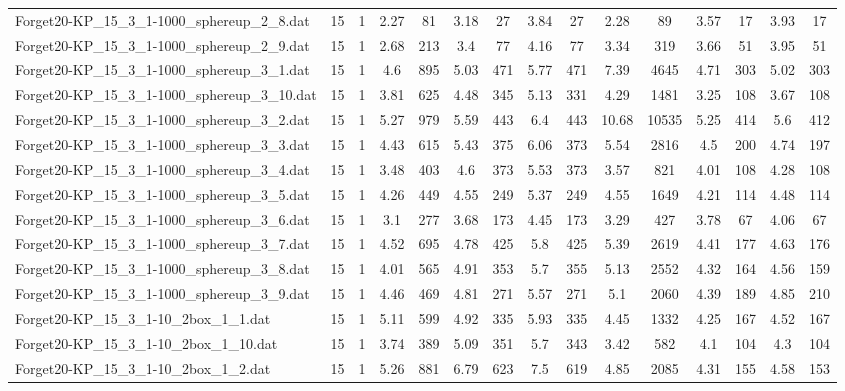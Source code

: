 \begin{table}[!ht]
{\begin{tabular}{lcccccccccccccc}
Forget20-KP\_15\_3\_1-1000\_sphereup\_2\_8.dat & 15 & 1 & 2.27 & 81 & 3.18 & 27 & 3.84 & 27 & 2.28 & 89 & 3.57 & 17 & 3.93 & 17 \\
Forget20-KP\_15\_3\_1-1000\_sphereup\_2\_9.dat & 15 & 1 & 2.68 & 213 & 3.4 & 77 & 4.16 & 77 & 3.34 & 319 & 3.66 & 51 & 3.95 & 51 \\
Forget20-KP\_15\_3\_1-1000\_sphereup\_3\_1.dat & 15 & 1 & 4.6 & 895 & 5.03 & 471 & 5.77 & 471 & 7.39 & 4645 & 4.71 & 303 & 5.02 & 303 \\
Forget20-KP\_15\_3\_1-1000\_sphereup\_3\_10.dat & 15 & 1 & 3.81 & 625 & 4.48 & 345 & 5.13 & 331 & 4.29 & 1481 & 3.25 & 108 & 3.67 & 108 \\
Forget20-KP\_15\_3\_1-1000\_sphereup\_3\_2.dat & 15 & 1 & 5.27 & 979 & 5.59 & 443 & 6.4 & 443 & 10.68 & 10535 & 5.25 & 414 & 5.6 & 412 \\
Forget20-KP\_15\_3\_1-1000\_sphereup\_3\_3.dat & 15 & 1 & 4.43 & 615 & 5.43 & 375 & 6.06 & 373 & 5.54 & 2816 & 4.5 & 200 & 4.74 & 197 \\
Forget20-KP\_15\_3\_1-1000\_sphereup\_3\_4.dat & 15 & 1 & 3.48 & 403 & 4.6 & 373 & 5.53 & 373 & 3.57 & 821 & 4.01 & 108 & 4.28 & 108 \\
Forget20-KP\_15\_3\_1-1000\_sphereup\_3\_5.dat & 15 & 1 & 4.26 & 449 & 4.55 & 249 & 5.37 & 249 & 4.55 & 1649 & 4.21 & 114 & 4.48 & 114 \\
Forget20-KP\_15\_3\_1-1000\_sphereup\_3\_6.dat & 15 & 1 & 3.1 & 277 & 3.68 & 173 & 4.45 & 173 & 3.29 & 427 & 3.78 & 67 & 4.06 & 67 \\
Forget20-KP\_15\_3\_1-1000\_sphereup\_3\_7.dat & 15 & 1 & 4.52 & 695 & 4.78 & 425 & 5.8 & 425 & 5.39 & 2619 & 4.41 & 177 & 4.63 & 176 \\
Forget20-KP\_15\_3\_1-1000\_sphereup\_3\_8.dat & 15 & 1 & 4.01 & 565 & 4.91 & 353 & 5.7 & 355 & 5.13 & 2552 & 4.32 & 164 & 4.56 & 159 \\
Forget20-KP\_15\_3\_1-1000\_sphereup\_3\_9.dat & 15 & 1 & 4.46 & 469 & 4.81 & 271 & 5.57 & 271 & 5.1 & 2060 & 4.39 & 189 & 4.85 & 210 \\
Forget20-KP\_15\_3\_1-10\_2box\_1\_1.dat & 15 & 1 & 5.11 & 599 & 4.92 & 335 & 5.93 & 335 & 4.45 & 1332 & 4.25 & 167 & 4.52 & 167 \\
Forget20-KP\_15\_3\_1-10\_2box\_1\_10.dat & 15 & 1 & 3.74 & 389 & 5.09 & 351 & 5.7 & 343 & 3.42 & 582 & 4.1 & 104 & 4.3 & 104 \\
Forget20-KP\_15\_3\_1-10\_2box\_1\_2.dat & 15 & 1 & 5.26 & 881 & 6.79 & 623 & 7.5 & 619 & 4.85 & 2085 & 4.31 & 155 & 4.58 & 153 \\

\end{tabular}}
\end{table}
